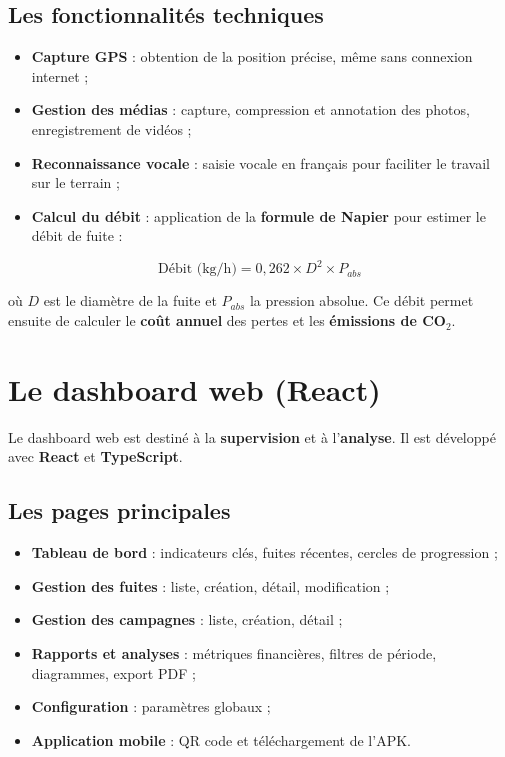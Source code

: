 \documentclass[12pt,a4paper,oneside]{report}
\begin{document}
\subsection{Les fonctionnalités techniques}

\begin{itemize}
    \item \textbf{Capture GPS} : obtention de la position précise, même sans connexion internet ;
    \item \textbf{Gestion des médias} : capture, compression et annotation des photos, enregistrement de vidéos ;
    \item \textbf{Reconnaissance vocale} : saisie vocale en français pour faciliter le travail sur le terrain ;
    \item \textbf{Calcul du débit} : application de la \textbf{formule de Napier} pour estimer le débit de fuite :
\end{itemize}

\begin{equation}
\text{Débit (kg/h)} = 0{,}262 \times D^2 \times P_{abs}
\end{equation}

où $D$ est le diamètre de la fuite et $P_{abs}$ la pression absolue. Ce débit permet ensuite de calculer le \textbf{coût annuel} des pertes et les \textbf{émissions de CO$_2$}.

\section{Le dashboard web (React)}

Le dashboard web est destiné à la \textbf{supervision} et à l'\textbf{analyse}. Il est développé avec \textbf{React} et \textbf{TypeScript}.

\subsection{Les pages principales}

\begin{itemize}
    \item \textbf{Tableau de bord} : indicateurs clés, fuites récentes, cercles de progression ;
    \item \textbf{Gestion des fuites} : liste, création, détail, modification ;
    \item \textbf{Gestion des campagnes} : liste, création, détail ;
    \item \textbf{Rapports et analyses} : métriques financières, filtres de période, diagrammes, export PDF ;
    \item \textbf{Configuration} : paramètres globaux ;
    \item \textbf{Application mobile} : QR code et téléchargement de l'APK.
\end{itemize}
\end{document}
